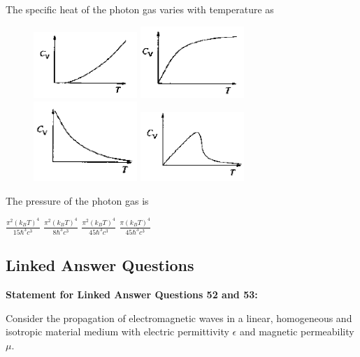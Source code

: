 \documentclass{exam}
\begin{document}
\begin{questions}
\question The specific heat of the photon gas varies with temperature as\hfill{}
\begin{figure}[H]
	\centering
	\includegraphics[width=0.35\textwidth]{pics/50a.png}
	\includegraphics[width=0.35\textwidth]{pics/50b.png}
	\includegraphics[width=0.35\textwidth]{pics/50c.png}
	\includegraphics[width=0.35\textwidth]{pics/50d.png}
\end{figure}

\question The pressure of the photon gas is\hfill{}

\begin{oneparchoices}
	\choice $\frac{\pi^2(k_B T)^4}{15 \hbar^3 c^3}$ \choice $\frac{\pi^2(k_B T)^4}{8 \hbar^3 c^3}$
	\choice $\frac{\pi^2(k_B T)^4}{45 \hbar^3 c^3}$ \choice $\frac{\pi(k_B T)^4}{45 \hbar^3 c^3}$
\end{oneparchoices}

\subsection*{Linked Answer Questions}
\textbf{Statement for Linked Answer Questions 52 and 53:}
\par\noindent Consider the propagation of electromagnetic waves in a linear, homogeneous and isotropic material medium with electric permittivity $\epsilon$ and magnetic permeability $\mu$.


\end{questions}
\end{document}

